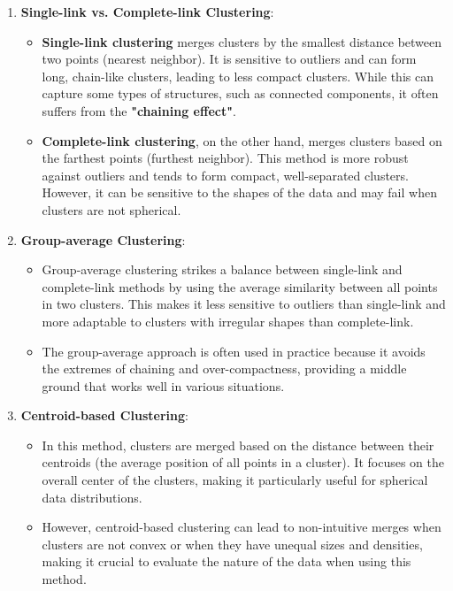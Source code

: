 \documentclass[a4paper,12pt]{article}
\begin{document}
\begin{enumerate}
\begin{enumerate}
    \item \textbf{Single-link vs. Complete-link Clustering}:
    \begin{itemize}
        \item \textbf{Single-link clustering} merges clusters by the smallest distance between two points (nearest neighbor). It is sensitive to outliers and can form long, chain-like clusters, leading to less compact clusters. While this can capture some types of structures, such as connected components, it often suffers from the \textbf{"chaining effect"}.
        \item \textbf{Complete-link clustering}, on the other hand, merges clusters based on the farthest points (furthest neighbor). This method is more robust against outliers and tends to form compact, well-separated clusters. However, it can be sensitive to the shapes of the data and may fail when clusters are not spherical.
    \end{itemize}

    \item \textbf{Group-average Clustering}:
    \begin{itemize}
        \item Group-average clustering strikes a balance between single-link and complete-link methods by using the average similarity between all points in two clusters. This makes it less sensitive to outliers than single-link and more adaptable to clusters with irregular shapes than complete-link.
        \item The group-average approach is often used in practice because it avoids the extremes of chaining and over-compactness, providing a middle ground that works well in various situations.
    \end{itemize}

    \item \textbf{Centroid-based Clustering}:
    \begin{itemize}
        \item In this method, clusters are merged based on the distance between their centroids (the average position of all points in a cluster). It focuses on the overall center of the clusters, making it particularly useful for spherical data distributions.
        \item However, centroid-based clustering can lead to non-intuitive merges when clusters are not convex or when they have unequal sizes and densities, making it crucial to evaluate the nature of the data when using this method.
    \end{itemize}


\end{enumerate}
\end{enumerate}
\end{document}
